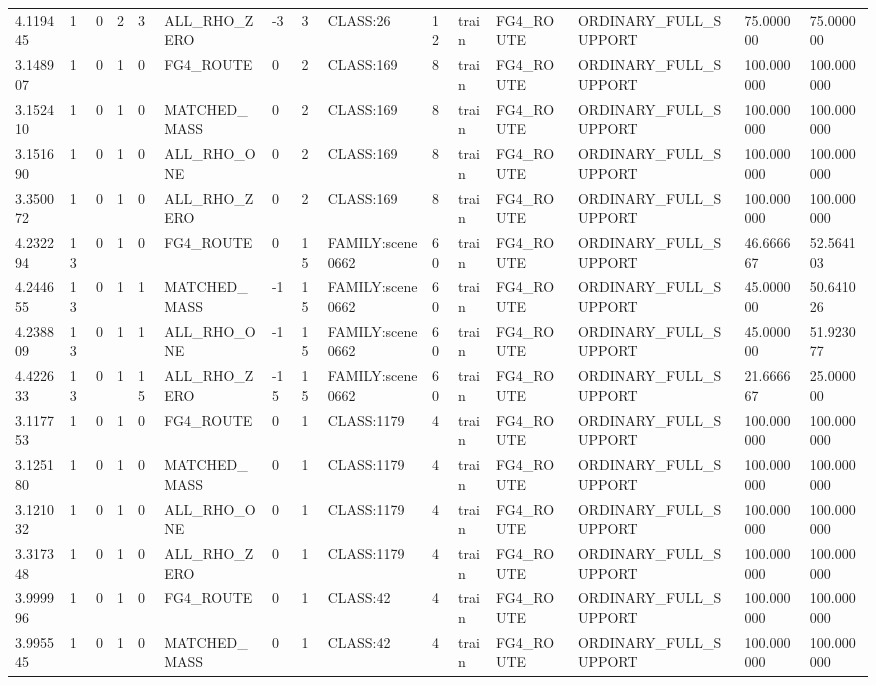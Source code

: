 \begin{tabular}{lllllllllllllll}
4.119445 & 1 & 0 & 2 & 3 & ALL\_RHO\_ZERO & -3 & 3 & CLASS:26 & 12 & train & FG4\_ROUTE & ORDINARY\_FULL\_SUPPORT & 75.000000 & 75.000000 \\
3.148907 & 1 & 0 & 1 & 0 & FG4\_ROUTE & 0 & 2 & CLASS:169 & 8 & train & FG4\_ROUTE & ORDINARY\_FULL\_SUPPORT & 100.000000 & 100.000000 \\
3.152410 & 1 & 0 & 1 & 0 & MATCHED\_MASS & 0 & 2 & CLASS:169 & 8 & train & FG4\_ROUTE & ORDINARY\_FULL\_SUPPORT & 100.000000 & 100.000000 \\
3.151690 & 1 & 0 & 1 & 0 & ALL\_RHO\_ONE & 0 & 2 & CLASS:169 & 8 & train & FG4\_ROUTE & ORDINARY\_FULL\_SUPPORT & 100.000000 & 100.000000 \\
3.350072 & 1 & 0 & 1 & 0 & ALL\_RHO\_ZERO & 0 & 2 & CLASS:169 & 8 & train & FG4\_ROUTE & ORDINARY\_FULL\_SUPPORT & 100.000000 & 100.000000 \\
4.232294 & 13 & 0 & 1 & 0 & FG4\_ROUTE & 0 & 15 & FAMILY:scene0662 & 60 & train & FG4\_ROUTE & ORDINARY\_FULL\_SUPPORT & 46.666667 & 52.564103 \\
4.244655 & 13 & 0 & 1 & 1 & MATCHED\_MASS & -1 & 15 & FAMILY:scene0662 & 60 & train & FG4\_ROUTE & ORDINARY\_FULL\_SUPPORT & 45.000000 & 50.641026 \\
4.238809 & 13 & 0 & 1 & 1 & ALL\_RHO\_ONE & -1 & 15 & FAMILY:scene0662 & 60 & train & FG4\_ROUTE & ORDINARY\_FULL\_SUPPORT & 45.000000 & 51.923077 \\
4.422633 & 13 & 0 & 1 & 15 & ALL\_RHO\_ZERO & -15 & 15 & FAMILY:scene0662 & 60 & train & FG4\_ROUTE & ORDINARY\_FULL\_SUPPORT & 21.666667 & 25.000000 \\
3.117753 & 1 & 0 & 1 & 0 & FG4\_ROUTE & 0 & 1 & CLASS:1179 & 4 & train & FG4\_ROUTE & ORDINARY\_FULL\_SUPPORT & 100.000000 & 100.000000 \\
3.125180 & 1 & 0 & 1 & 0 & MATCHED\_MASS & 0 & 1 & CLASS:1179 & 4 & train & FG4\_ROUTE & ORDINARY\_FULL\_SUPPORT & 100.000000 & 100.000000 \\
3.121032 & 1 & 0 & 1 & 0 & ALL\_RHO\_ONE & 0 & 1 & CLASS:1179 & 4 & train & FG4\_ROUTE & ORDINARY\_FULL\_SUPPORT & 100.000000 & 100.000000 \\
3.317348 & 1 & 0 & 1 & 0 & ALL\_RHO\_ZERO & 0 & 1 & CLASS:1179 & 4 & train & FG4\_ROUTE & ORDINARY\_FULL\_SUPPORT & 100.000000 & 100.000000 \\
3.999996 & 1 & 0 & 1 & 0 & FG4\_ROUTE & 0 & 1 & CLASS:42 & 4 & train & FG4\_ROUTE & ORDINARY\_FULL\_SUPPORT & 100.000000 & 100.000000 \\
3.995545 & 1 & 0 & 1 & 0 & MATCHED\_MASS & 0 & 1 & CLASS:42 & 4 & train & FG4\_ROUTE & ORDINARY\_FULL\_SUPPORT & 100.000000 & 100.000000 \\

\end{tabular}
